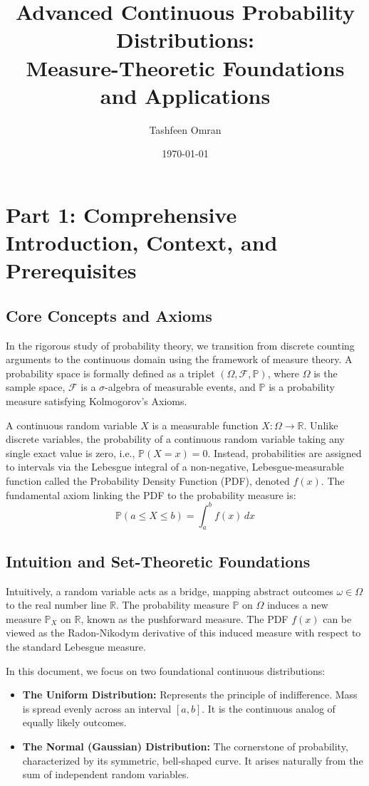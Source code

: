 \documentclass[11pt, a4paper]{article}
\title{\textbf{Advanced Continuous Probability Distributions: \\ Measure-Theoretic Foundations and Applications}}
\author{Tashfeen Omran}
\date{\today}
\theoremstyle{definition}
\theoremstyle{remark}
\newcommand{\R}{\mathbb{R}}
\newcommand{\Prob}{\mathbb{P}}
\newcommand{\F}{\mathcal{F}}
\begin{document}
\maketitle
\tableofcontents
\newpage

\section{Part 1: Comprehensive Introduction, Context, and Prerequisites}

\subsection{Core Concepts and Axioms}
In the rigorous study of probability theory, we transition from discrete counting arguments to the continuous domain using the framework of measure theory. A probability space is formally defined as a triplet $(\Omega, \F, \Prob)$, where $\Omega$ is the sample space, $\F$ is a $\sigma$-algebra of measurable events, and $\Prob$ is a probability measure satisfying Kolmogorov's Axioms. 

A continuous random variable $X$ is a measurable function $X: \Omega \to \R$. Unlike discrete variables, the probability of a continuous random variable taking any single exact value is zero, i.e., $\Prob(X = x) = 0$. Instead, probabilities are assigned to intervals via the Lebesgue integral of a non-negative, Lebesgue-measurable function called the Probability Density Function (PDF), denoted $f(x)$. The fundamental axiom linking the PDF to the probability measure is:
\[ \Prob(a \le X \le b) = \int_{a}^{b} f(x) \, dx \]

\subsection{Intuition and Set-Theoretic Foundations}
Intuitively, a random variable acts as a bridge, mapping abstract outcomes $\omega \in \Omega$ to the real number line $\R$. The probability measure $\Prob$ on $\Omega$ induces a new measure $\Prob_X$ on $\R$, known as the pushforward measure. The PDF $f(x)$ can be viewed as the Radon-Nikodym derivative of this induced measure with respect to the standard Lebesgue measure. 

In this document, we focus on two foundational continuous distributions:
\begin{itemize}
    \item \textbf{The Uniform Distribution:} Represents the principle of indifference. Mass is spread evenly across an interval $[a, b]$. It is the continuous analog of equally likely outcomes.
    \item \textbf{The Normal (Gaussian) Distribution:} The cornerstone of probability, characterized by its symmetric, bell-shaped curve. It arises naturally from the sum of independent random variables.
\end{itemize}
\end{document}
